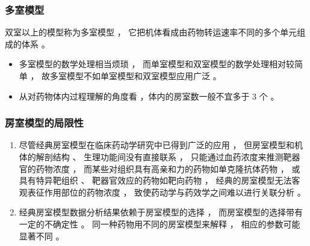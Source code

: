 \documentclass[dvipsnames, svgnames, x11names]{beamer}
\begin{document}
\begin{frame}
	\frametitle{多室模型}
	\begin{minipage}{0.58\linewidth}
		双室以上的模型称为多室模型 ， 它把机体看成由药物转运速率不同的多个单元组成的体系 。 
	\begin{itemize}
	  \item 多室模型的数学处理相当烦琐 ， 而单室模型和双室模型的数学处理相对较简单 ， 故多室模型不如单室模型和双室模型应用广泛 。
	  \item  从对药物体内过程理解的角度看 ，体内的房室数一般不宜多于 3 个 。
	\end{itemize}
	\end{minipage}\hfill
	\begin{minipage}{0.38\linewidth}
		\begin{center}
		\end{center}
	\end{minipage}
	
\end{frame}


\begin{frame}
	\frametitle{房室模型的局限性}
	\begin{enumerate}
	  \item 尽管经典房室模型在临床药动学研究中已得到广泛的应用 ， 但房室模型和机体的解剖结构 、 生理功能间没有直接联系 ， 只能通过血药浓度来推测靶器官的药物浓度 ， 而某些对组织具有高亲和力的药物如单克隆抗体药物 ， 或具有特异靶组织 、 靶器官效应的药物如靶向药物 ， 经典的房室模型无法客观表征作用部位的药物浓度 ， 致使药动学与药效学之间难以进行关联分析 。
	  \item 经典房室模型数据分析结果依赖于房室模型的选择 ， 而房室模型的选择带有一定的不确定性 。 同一种药物用不同的房室模型来解释 ， 相应的参数可能显著不同 。
	\end{enumerate}
\end{frame}
\end{document}
